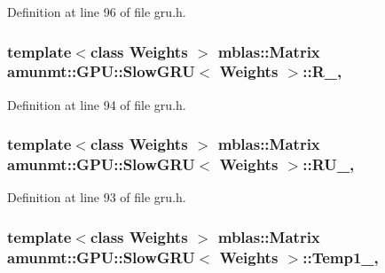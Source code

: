Definition at line 96 of file gru.\+h.

\subsubsection[{\texorpdfstring{R\+\_\+}{R_}}]{\setlength{\rightskip}{0pt plus 5cm}template$<$class Weights $>$ {\bf mblas\+::\+Matrix} {\bf amunmt\+::\+G\+P\+U\+::\+Slow\+G\+RU}$<$ {\bf Weights} $>$\+::R\+\_\+\hspace{0.3cm}{\ttfamily [mutable]}, {\ttfamily [private]}}\hypertarget{classamunmt_1_1GPU_1_1SlowGRU_a6149bb77260336fc2fcb996efb869894}{}\label{classamunmt_1_1GPU_1_1SlowGRU_a6149bb77260336fc2fcb996efb869894}


Definition at line 94 of file gru.\+h.

\subsubsection[{\texorpdfstring{R\+U\+\_\+}{RU_}}]{\setlength{\rightskip}{0pt plus 5cm}template$<$class Weights $>$ {\bf mblas\+::\+Matrix} {\bf amunmt\+::\+G\+P\+U\+::\+Slow\+G\+RU}$<$ {\bf Weights} $>$\+::R\+U\+\_\+\hspace{0.3cm}{\ttfamily [mutable]}, {\ttfamily [private]}}\hypertarget{classamunmt_1_1GPU_1_1SlowGRU_a6d2c972c738d73a06832fc1c986c0661}{}\label{classamunmt_1_1GPU_1_1SlowGRU_a6d2c972c738d73a06832fc1c986c0661}


Definition at line 93 of file gru.\+h.

\subsubsection[{\texorpdfstring{Temp1\+\_\+}{Temp1_}}]{\setlength{\rightskip}{0pt plus 5cm}template$<$class Weights $>$ {\bf mblas\+::\+Matrix} {\bf amunmt\+::\+G\+P\+U\+::\+Slow\+G\+RU}$<$ {\bf Weights} $>$\+::Temp1\+\_\+\hspace{0.3cm}{\ttfamily [mutable]}, {\ttfamily [private]}}\hypertarget{classamunmt_1_1GPU_1_1SlowGRU_a016b0350577ab601124fb3fa00454bd5}{}\label{classamunmt_1_1GPU_1_1SlowGRU_a016b0350577ab601124fb3fa00454bd5}


